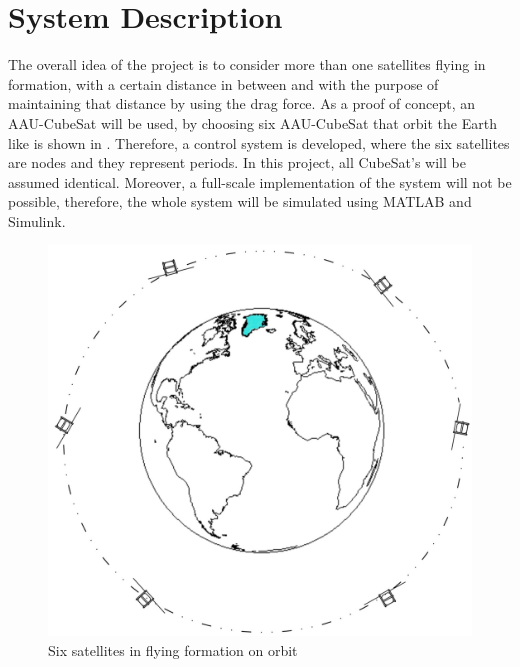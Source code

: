 \chapter{System Description}\label{chap:systemDescribtion}
The overall idea of the project is to consider more than one satellites flying in formation, with a certain distance in between and with the purpose of maintaining that distance by using the drag force. As a proof of concept, an AAU-CubeSat will be used, by choosing six AAU-CubeSat that orbit the Earth like is shown in  . Therefore, a control system is developed, where the six satellites are nodes and they represent periods. %
 In this project, all CubeSat's will be assumed identical. Moreover, a full-scale implementation of the system will not be possible, therefore, the whole system will be simulated using MATLAB and Simulink. 
%
\begin{figure}[H]
	\centering
	\includegraphics[width=0.7\linewidth]{figures/sat_form}
	\caption{Six satellites in flying formation on orbit}
	\label{fig:1}
\end{figure}
%
